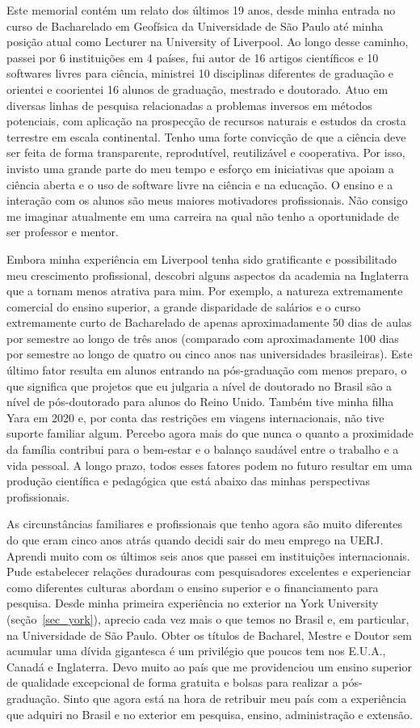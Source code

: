 \documentclass[12pt,a4paper,oneside]{book}
\newcommand{\USP}{Universidade de São Paulo}
\newcommand{\UoL}{University of Liverpool}
\begin{document}
Este memorial contém um relato dos últimos 19 anos, desde minha entrada no
curso de Bacharelado em Geofísica da \USP{} até minha
posição atual como Lecturer na \UoL{}.
Ao longo desse caminho, passei por 6 instituições em 4 países, fui autor de 16
artigos científicos e 10 softwares livres para ciência, ministrei 10
disciplinas diferentes de graduação e orientei e coorientei 16 alunos de
graduação, mestrado e doutorado.
Atuo em diversas linhas de pesquisa relacionadas a problemas inversos em
métodos potenciais, com aplicação na prospecção de recursos naturais e estudos
da crosta terrestre em escala continental.
Tenho uma forte convicção de que a ciência deve ser feita de forma
transparente, reprodutível, reutilizável e cooperativa.
Por isso, invisto uma grande parte do meu tempo e esforço em iniciativas que
apoiam a ciência aberta e o uso de software livre na ciência e na educação.
O ensino e a interação com os alunos são meus maiores motivadores
profissionais.
Não consigo me imaginar atualmente em uma carreira na qual não tenho a
oportunidade de ser professor e mentor.

Embora minha experiência em Liverpool tenha sido gratificante e possibilitado
meu crescimento profissional, descobri alguns aspectos da academia na
Inglaterra que a tornam menos atrativa para mim.
Por exemplo, a natureza extremamente comercial do ensino superior, a grande
disparidade de salários e o curso extremamente curto de Bacharelado de apenas
aproximadamente 50 dias de aulas por semestre ao longo de três anos (comparado
com aproximadamente 100 dias por semestre ao longo de quatro ou cinco anos nas
universidades brasileiras).
Este último fator resulta em alunos entrando na pós-graduação com menos
preparo, o que significa que projetos que eu julgaria a nível de doutorado no
Brasil são a nível de pós-doutorado para alunos do Reino Unido.
Também tive minha filha Yara em 2020 e, por conta das restrições em viagens
internacionais, não tive suporte familiar algum.
Percebo agora mais do que nunca o quanto a proximidade da família contribui
para o bem-estar e o balanço saudável entre o trabalho e a vida pessoal.
A longo prazo, todos esses fatores podem no futuro resultar em uma produção
científica e pedagógica que está abaixo das minhas perspectivas profissionais.

As circunstâncias familiares e profissionais que tenho agora são muito
diferentes do que eram cinco anos atrás quando decidi sair do meu emprego na
UERJ.
Aprendi muito com os últimos seis anos que passei em instituições
internacionais.
Pude estabelecer relações duradouras com pesquisadores excelentes e
experienciar como diferentes culturas abordam o ensino superior e o
financiamento para pesquisa.
Desde minha primeira experiência no exterior na York University
(seção~\ref{sec_york}), aprecio cada vez mais o que temos no Brasil e, em
particular, na \USP{}.
Obter os títulos de Bacharel, Mestre e Doutor sem acumular uma dívida
gigantesca é um privilégio que poucos tem nos E.U.A., Canadá e Inglaterra.
Devo muito ao país que me providenciou um ensino superior de qualidade
excepcional de forma gratuita e bolsas para realizar a pós-graduação.
Sinto que agora está na hora de retribuir meu país com a experiência que
adquiri no Brasil e no exterior em pesquisa, ensino, administração e extensão.
\end{document}
